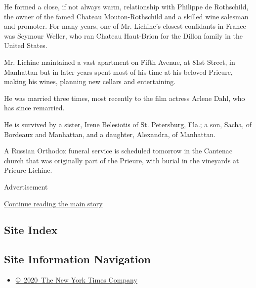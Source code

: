 He formed a close, if not always warm, relationship with Philippe de
Rothschild, the owner of the famed Chateau Mouton-Rothschild and a
skilled wine salesman and promoter. For many years, one of Mr. Lichine's
closest confidants in France was Seymour Weller, who ran Chateau
Haut-Brion for the Dillon family in the United States.

Mr. Lichine maintained a vast apartment on Fifth Avenue, at 81st Street,
in Manhattan but in later years spent most of his time at his beloved
Prieure, making his wines, planning new cellars and entertaining.

He was married three times, most recently to the film actress Arlene
Dahl, who has since remarried.

He is survived by a sister, Irene Belesiotis of St. Petersburg, Fla.; a
son, Sacha, of Bordeaux and Manhattan, and a daughter, Alexandra, of
Manhattan.

A Russian Orthodox funeral service is scheduled tomorrow in the Cantenac
church that was originally part of the Prieure, with burial in the
vineyards at Prieure-Lichine.

Advertisement

\protect\hyperlink{after-bottom}{Continue reading the main story}

\hypertarget{site-index}{%
\subsection{Site Index}\label{site-index}}

\hypertarget{site-information-navigation}{%
\subsection{Site Information
Navigation}\label{site-information-navigation}}

\begin{itemize}
\tightlist
\item
  \href{https://help.nytimes3xbfgragh.onion/hc/en-us/articles/115014792127-Copyright-notice}{©~2020~The
  New York Times Company}
\end{itemize}

